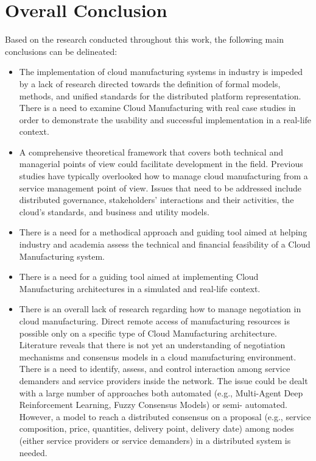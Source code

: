 \section{Overall Conclusion}
Based on the research conducted throughout this work, the following main conclusions can be delineated:
\begin{itemize}
    \item The implementation of cloud manufacturing systems in industry is impeded by a lack of research directed towards the definition of formal models, methods, and unified standards for the distributed platform representation. There is a need to examine Cloud Manufacturing with real case studies in order to demonstrate the usability and successful implementation in a real-life context.
    \item A comprehensive theoretical framework that covers both technical and managerial points of view could facilitate development in the  field. Previous studies have typically overlooked how to manage cloud manufacturing from a service management point of view. Issues that need to be addressed include distributed governance, stakeholders’ interactions and their activities, the cloud’s standards, and business and utility models.
    \item There is a need for a methodical approach and guiding tool aimed at helping industry and academia assess the technical and financial feasibility of a Cloud Manufacturing system.
    \item There is a need for a guiding tool aimed at implementing Cloud Manufacturing architectures in a simulated and real-life context.
    \item There is an overall lack of research regarding how to manage negotiation in cloud manufacturing. Direct remote access of manufacturing resources is possible only on a specific type of Cloud Manufacturing architecture. Literature reveals that there is not yet an understanding of negotiation mechanisms and consensus models in a cloud manufacturing environment. There is a need to identify, assess, and control interaction among service demanders and service providers inside the network. The issue could be dealt with a large number of approaches both automated (e.g., Multi-Agent Deep Reinforcement Learning, Fuzzy Consensus Models) or semi- automated. However, a model to reach a distributed consensus on a proposal (e.g., service composition, price, quantities, delivery point, delivery date) among nodes (either service providers or service demanders) in a distributed system is needed.
\end{itemize}
